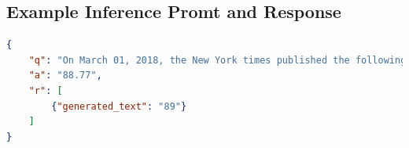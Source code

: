 \documentclass[conference]{IEEEtran}
\begin{document}


\onecolumn
\appendix
\subsection{Example Inference Promt and Response}
\label{Examples}
\begin{lstlisting}[language=json,firstnumber=1]
{
	"q": "On March 01, 2018, the New York times published the following article regarding Walmart(Ticker: WMT) from their Business news desk. Headline: Walmart to Raise Age to Buy Guns and Ammunition to 21. Lead paragraph: Walmart, the largest retailer in the United States, said Wednesday evening that it would stop selling guns and ammunition to anyone under 21 years of age and remove from its stores all toys and airsoft rifles that resemble assault-style weapons. When the news of this was released, past stock prices were: $92.77, $92.89, $93.12, $91.52, $90.01, $89.08. After this news was announced, the following day's price was: $",
	"a": "88.77",
	"r": [
		{"generated_text": "89"}
	]
}
\end{lstlisting}
\end{document}
